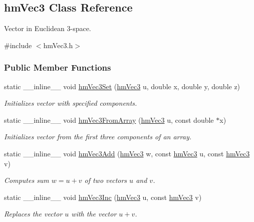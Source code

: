 \hypertarget{classhm_vec3}{\subsection{hm\-Vec3 Class Reference}
\label{classhm_vec3}
}


Vector in Euclidean 3-\/space.  




{\ttfamily \#include $<$hm\-Vec3.\-h$>$}

\subsubsection*{Public Member Functions}
\begin{DoxyCompactItemize}
\item 
static \-\_\-\-\_\-inline\-\_\-\-\_\- void \hyperlink{classhm_vec3_a3ed2e56643859ddca199341139b22abb}{hm\-Vec3\-Set} (\hyperlink{classhm_vec3}{hm\-Vec3} u, double x, double y, double z)
\begin{DoxyCompactList}\small\item\em Initializes vector with specified components. \end{DoxyCompactList}\item 
static \-\_\-\-\_\-inline\-\_\-\-\_\- void \hyperlink{classhm_vec3_a3ed200349a4473088a3b48c1bf9e9840}{hm\-Vec3\-From\-Array} (\hyperlink{classhm_vec3}{hm\-Vec3} u, const double $\ast$x)
\begin{DoxyCompactList}\small\item\em Initializes vector from the first three components of an array. \end{DoxyCompactList}\item 
static \-\_\-\-\_\-inline\-\_\-\-\_\- void \hyperlink{classhm_vec3_ad89688c03eb724c8ad3d864db05245b2}{hm\-Vec3\-Add} (\hyperlink{classhm_vec3}{hm\-Vec3} w, const \hyperlink{classhm_vec3}{hm\-Vec3} u, const \hyperlink{classhm_vec3}{hm\-Vec3} v)
\begin{DoxyCompactList}\small\item\em Computes sum $w=u+v$ of two vectors $u$ and $v$. \end{DoxyCompactList}\item 
static \-\_\-\-\_\-inline\-\_\-\-\_\- void \hyperlink{classhm_vec3_a7072b43a1bc62f162699b501edf19c2b}{hm\-Vec3\-Inc} (\hyperlink{classhm_vec3}{hm\-Vec3} u, const \hyperlink{classhm_vec3}{hm\-Vec3} v)
\begin{DoxyCompactList}\small\item\em Replaces the vector $u$ with the vector $u+v$. \end{DoxyCompactList}\item 

\end{DoxyCompactItemize}
